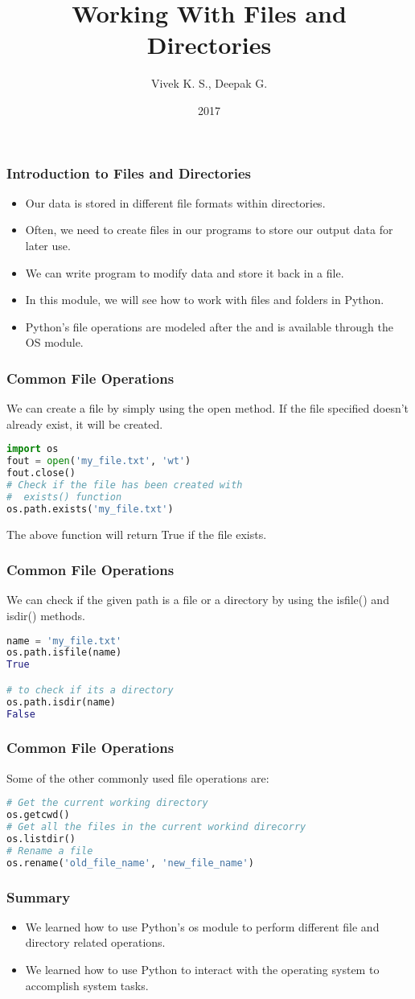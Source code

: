 \documentclass{beamer}
\title{Working With Files and Directories}
\author{Vivek K. S., Deepak G.}
\institute{Information Systems Decision Sciences (ISDS)\\
MUMA College of Business\\
University of South Florida \\
Tampa, Florida}
\date{2017}
\begin{document}
\frame{\titlepage}

\begin{frame}
\frametitle{Introduction to Files and Directories}
\begin{itemize}
\item Our data is stored in different file formats within directories.
\item Often, we need to create files in our programs to store our output data for later use.
\item We can write program to modify data and store it back in a file.
\item In this module, we will see how to work with files and folders in Python.
\item Python's file operations are modeled after the \textit{\color{blue}{Unix System}} and is available through the OS module.
\end{itemize}
\end{frame}

\begin{frame}[fragile]
\frametitle{Common File Operations}
We can create a file by simply using the open method. If the file specified doesn't already exist, it will be created.
\begin{lstlisting}[language=Python]
import os
fout = open('my_file.txt', 'wt')
fout.close()
# Check if the file has been created with 
#  exists() function
os.path.exists('my_file.txt')

\end{lstlisting}
The above function will return {\color{blue} True} if the file exists.
\end{frame}

\begin{frame}[fragile]
\frametitle{Common File Operations}
We can check if the given path is a file or a directory by using the isfile() and isdir() methods.
\begin{lstlisting}[language=Python]
name = 'my_file.txt'
os.path.isfile(name)
True

# to check if its a directory
os.path.isdir(name)
False
\end{lstlisting}
\end{frame}


\begin{frame}[fragile]
\frametitle{Common File Operations}
Some of the other commonly used file  operations are:
\begin{lstlisting}[language=Python]
# Get the current working directory
os.getcwd()
# Get all the files in the current workind direcorry
os.listdir()
# Rename a file
os.rename('old_file_name', 'new_file_name')
\end{lstlisting}

\end{frame}

\begin{frame}
\frametitle{Summary}
\begin{itemize}
\item We learned how to use Python's os module to perform different file and directory related operations.
\item We learned how to use Python to interact with the operating system to accomplish system tasks.

\end{itemize}
\end{frame}
\end{document}
